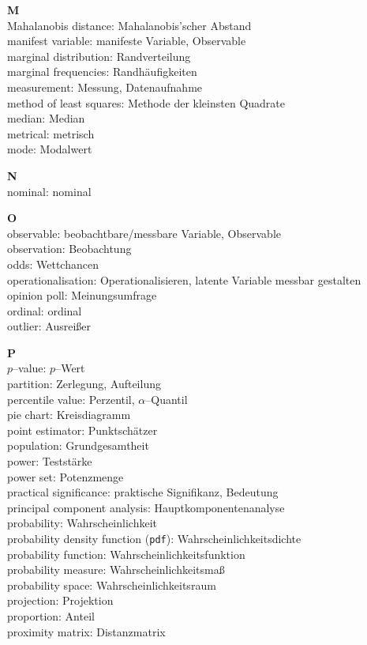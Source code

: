 \medskip
\noindent
{\bf M}\\
Mahalanobis distance: Mahalanobis'scher Abstand\\
manifest variable: manifeste Variable, Observable\\
marginal distribution: Randverteilung\\
marginal frequencies: Randh\"{a}ufigkeiten\\
measurement: Messung, Datenaufnahme\\
method of least squares: Methode der kleinsten Quadrate\\
median: Median\\
metrical: metrisch\\
mode: Modalwert

\medskip
\noindent
{\bf N}\\
nominal: nominal

\medskip
\noindent
{\bf O}\\
observable: beobachtbare/messbare Variable, Observable\\
observation: Beobachtung\\
odds: Wettchancen \\
operationalisation: Operationalisieren, latente Variable messbar 
gestalten\\
opinion poll: Meinungsumfrage\\
ordinal: ordinal\\
outlier: Ausrei\ss er

\medskip
\noindent
{\bf P}\\
$p$--value: $p$--Wert\\
partition: Zerlegung, Aufteilung\\
percentile value: Perzentil, $\alpha$--Quantil\\
pie chart: Kreisdiagramm\\
point estimator: Punktsch\"{a}tzer\\
population: Grundgesamtheit\\
power: Testst\"{a}rke\\
power set: Potenzmenge\\
practical significance: praktische Signifikanz, Bedeutung\\
principal component analysis: Hauptkomponentenanalyse\\
probability: Wahrscheinlichkeit\\
probability density function ({\tt pdf}): 
Wahrscheinlichkeitsdichte\\
probability function: Wahrscheinlichkeitsfunktion\\
probability measure: Wahrscheinlichkeitsma\ss\\
probability space: Wahrscheinlichkeitsraum\\
projection: Projektion\\
proportion: Anteil\\
proximity matrix: Distanzmatrix

